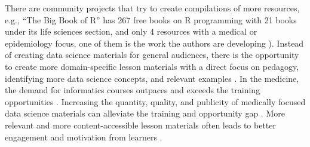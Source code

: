 \documentclass[020-persona\_validation.tex]{subfiles}
\begin{document}
    There are community projects that try to create compilations of more resources,
    e.g., ``The Big Book of R'' has 267 free books on R programming with
    21 books under its life sciences section, and
    only 4 resources with a medical or epidemiology focus,
    one of them is the work the authors are developing \cite{baruffaBigBook2021}).
    Instead of creating data science materials for general audiences,
    there is the opportunity to create more domain-specific lesson materials
    with a direct focus on pedagogy,
    identifying more data science concepts,
    and relevant examples
    \cite{krossDemocratizationDataScience2020}.
    In the medicine, the demand for informatics courses outpaces and exceeds the training opportunities
    \cite{banerjeeMedicalStudentAwareness2015, americanmedicalassociationStudentInterestInformatics, americanmedicalassociationAcceleratingChangeMedical2021, americanmedicalassociationEducation}.
    Increasing the quantity, quality, and publicity of medically focused
    data science materials can alleviate the training and opportunity gap
    \cite{banerjeeMedicalStudentAwareness2015, americanmedicalassociationAcceleratingChangeMedical2021}.
    More relevant and more content-accessible lesson materials often leads to better engagement and motivation from learners
    \cite{wilson2019teaching, ambrose2010learning, Koch2016}.
    

\end{document}
